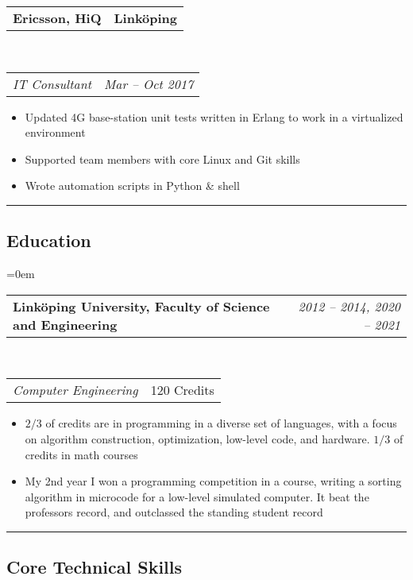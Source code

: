 \documentclass[10pt,letterpaper]{article}
\makeatletter
\newcommand{\headerrow}[2]
{\begin{tabular*}{\linewidth}{l@{\extracolsep{\fill}}r}
	#1 &
	#2 \\
\end{tabular*}}
\makeatother
\begin{document}
\headerrow
{\textbf{Ericsson, HiQ}}
{\textbf{Linköping}}
\\
\headerrow
{\emph{IT Consultant}}
{\emph{Mar -- Oct 2017}}
\begin{itemize}[noitemsep, topsep=0pt]
    \item Updated 4G base-station unit tests written in
        Erlang to work in a virtualized environment
    \item Supported team members with core Linux and Git skills
    \item Wrote automation scripts in Python \& shell
\end{itemize}
\vspace{0.5em}



\hrule
\vspace{-0.4em}
\subsection*{Education}
\parindent=0em

\headerrow
    {\textbf{Linköping University, Faculty of Science and Engineering}}
    {\emph{2012 -- 2014, 2020 -- 2021}}
\\
\headerrow
    {\emph{Computer Engineering}}
    {120 Credits}
\begin{itemize}[noitemsep, topsep=0pt]
    \item \( 2/3 \) of credits are in programming in a diverse set of
        languages, with a focus on algorithm construction, optimization,
        low-level code, and hardware. \( 1/3 \) of credits in math courses
    \item My 2nd year I won a programming competition in a course,
        writing a sorting algorithm in microcode for
        a low-level simulated computer. It beat the
        professors record, and outclassed the standing student record
\end{itemize}
\vspace{0.5em}



\hrule
\vspace{-0.4em}
\subsection*{Core Technical Skills}
\end{document}
